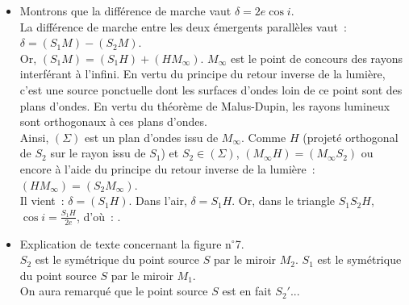 \documentclass{article}
\newcommand{\mathcolorbox}[2]{\fcolorbox{black}{#1}{$#2$}}
\begin{document}
\begin{itemize}
\item Montrons que la différence de marche vaut $\delta = 2e\cos i$. \\
La différence de marche entre les deux émergents parallèles vaut :
$\delta = \left(S_{1}M\right)-\left(S_{2}M\right)$. \\
Or, $\left(S_{1}M\right) = \left(S_{1}H\right)+\left(HM_{\mathrm{\infty}}\right)$. $M_{\mathrm{\infty}}$ est le point
de concours des rayons interférant à l'infini. En vertu du principe
du retour inverse de la lumière, c'est une source ponctuelle dont
les surfaces d'ondes loin de ce point sont des plans d'ondes. En
vertu du théorème de Malus-Dupin,
les rayons lumineux sont orthogonaux à ces plans d'ondes. \\
Ainsi, $\left(\Sigma\right)$ est un plan d'ondes issu de $M_{\mathrm{\infty}}$. Comme
$H$ (projeté orthogonal de $S_{2}$ sur le rayon issu de $S_{1}$) et
$S_{2} \in \left(\Sigma\right)$, $\left(M_{\mathrm{\infty}}H\right) = \left(M_{\mathrm{\infty}}S_{2}\right)$
ou encore à l'aide du principe du retour inverse de la lumière : $\left(HM_{\mathrm{\infty}}\right) = \left(S_{2}M_{\mathrm{\infty}}\right)$. \\
Il vient : $\delta = \left(S_{1}H\right)$. Dans l'air, $\delta = S_{1}H$. Or,
dans le triangle $S_{1}S_{2}H$, $\cos i = \frac{S_{1}H}{2e}$, d'où :
\mathcolorbox{gray!20}{\delta = 2e\cos i}.
\item Explication de texte concernant la figure n$^{\circ}$7. \\
$S_{2}$ est le symétrique du point source $S$ par le miroir $M_{2}$.
$S_{1}$ est le symétrique du point source $S$ par le miroir $M_{1}$.
\\
On aura remarqué que le point source $S$ est en fait $S_{2}'$...
\end{itemize}
\end{document}
